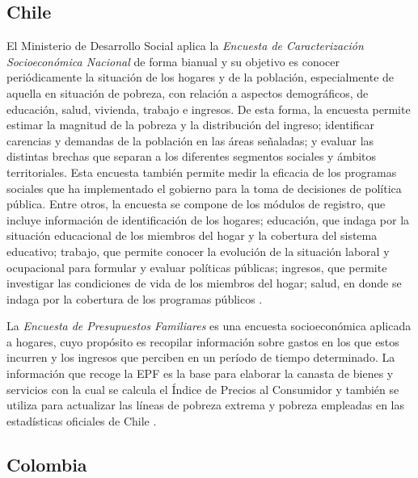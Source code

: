 \documentclass[12pt,spanish,]{book}
\begin{document}
\hypertarget{chile}{%
\subsection*{Chile}\label{chile}}

El Ministerio de Desarrollo Social aplica la \emph{Encuesta de Caracterización Socioeconómica Nacional} de forma bianual y su objetivo es conocer periódicamente la situación de los hogares y de la población, especialmente de aquella en situación de pobreza, con relación a aspectos demográficos, de educación, salud, vivienda, trabajo e ingresos. De esta forma, la encuesta permite estimar la magnitud de la pobreza y la distribución del ingreso; identificar carencias y demandas de la población en las áreas señaladas; y evaluar las distintas brechas que separan a los diferentes segmentos sociales y ámbitos territoriales. Esta encuesta también permite medir la eficacia de los programas sociales que ha implementado el gobierno para la toma de decisiones de política pública. Entre otros, la encuesta se compone de los módulos de registro, que incluye información de identificación de los hogares; educación, que indaga por la situación educacional de los miembros del hogar y la cobertura del sistema educativo; trabajo, que permite conocer la evolución de la situación laboral y ocupacional para formular y evaluar políticas públicas; ingresos, que permite investigar las condiciones de vida de los miembros del hogar; salud, en donde se indaga por la cobertura de los programas públicos \autocite{MDS-CL_2015}.

La \emph{Encuesta de Presupuestos Familiares} es una encuesta socioeconómica aplicada a hogares, cuyo propósito es recopilar información sobre gastos en los que estos incurren y los ingresos que perciben en un período de tiempo determinado. La información que recoge la EPF es la base para elaborar la canasta de bienes y servicios con la cual se calcula el Índice de Precios al Consumidor y también se utiliza para actualizar las líneas de pobreza extrema y pobreza empleadas en las estadísticas oficiales de Chile \autocite{INE_CL}.

\hypertarget{colombia}{%
\subsection*{Colombia}\label{colombia}}
\end{document}
